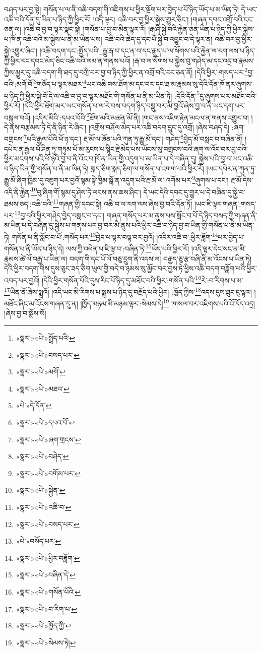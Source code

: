 བཤད་པར་བྱ་སྟེ། གསོན་པ་ལ་ནི་འཆི་བདག་གི་འཇིགས་པ་ཕྱིར་ལྡོག་པར་བྱེད་པ་པོ་ཉིད་ཡོད་པ་མ་ཡིན་ཏེ། དེ་ཡང་འཆི་བའི་དོན་དུ་ཡིན་པ་ཉིད་ཀྱི་ཕྱིར་རོ། །འདི་ལྟར། འཆི་བར་བྱ་ཕྱིར་སྐྱེས་གྱུར་ཅིང་། །གཞན་དབང་འགྲོ་བའི་ངང་ཅན་ལ། །འཆི་བ་བྱ་བ་ལྟར་སྣང་སྟེ། །གསོན་པ་བྱ་བ་མིན་ལྟར་རོ། །རྒ་ཤི་སྐྱེ་བའི་རྐྱེན་ཅན་ཡིན་པ་ཉིད་ཀྱི་ཕྱིར་སྐྱེས་པ་ཁོ་ན་འཆི་བའི་མ་སྐྱེས་པ་ནི་མ་ཡིན་པས། འཆི་བའི་ཆེད་དུ་དང་པོ་སྐྱེ་བ་འབྱུང་བ་དེ་ལྟར་ན། འཆི་བར་བྱ་ཕྱིར་སྐྱེ་འགྱུར་ཞིང་། །འཆི་བདག་དང་:སྤྱོད་པའི་\footnote{«སྣར་»«པེ་»སྤྲོད་པའི་}རྒྱུ་རྒ་བ་དང་ན་བ་དང་རྒུད་པ་ལ་སོགས་པའི་རྐྱེན་ལ་རག་ལས་པ་ཉིད་ཀྱི་ཕྱིར་རང་དབང་མེད་ཅིང་འཆི་བའི་ལམ་ན་གནས་པའོ། །རྒ་བ་ལ་སོགས་པ་སྐྱེས་བུ་གཤེད་མ་དང་འདྲ་བ་རྣམས་ཀྱིས་མྱུར་དུ་འཆི་བདག་གི་ཐད་དུ་བཀྲི་བར་བྱ་བ་ཉིད་ཀྱི་ཕྱིར་ན་འགྲོ་བའི་ངང་ཅན་ནོ། །དེའི་ཕྱིར་:གསད་པར་\footnote{«སྣར་»«པེ་»བསད་པར་}བྱ་བའི་:མགོ་བོ་\footnote{«སྣར་»«པེ་»མགོ་}གཅོད་པ་ལྟར་མཐར་\footnote{«སྣར་»«པེ་»མཐའ་}ཡང་འཆི་བས་ཐོག་མ་དང་བར་དང་ཐ་མ་རྣམས་སུ་དེའི་དོན་ཁོ་ནར་ཞུགས་པ་ཉིད་ཀྱི་ཕྱིར་སྐྱེ་བོ་དེ་ལ་འཆི་བ་བྱ་བ་ལྟར་མཐོང་གི་གསོན་པ་ནི་མ་ཡིན་ཏེ། :དེའི་དོན་\footnote{«པེ་»དེ་དོན་}དུ་ཞུགས་པར་མཐོང་བའི་ཕྱིར་རོ། །དེའི་ཕྱིར་ཐོག་མར་ཡང་གསོན་པ་ལ་རེ་བས་བདག་ཉིད་བསླུ་བར་མི་བྱའོ་ཞེས་བྱ་བ་ནི་ཡང་དག་པར་བསྐུལ་བའོ། །འདིར་མིའི་:དཔའ་བོའི་\footnote{«སྣར་»«པེ་»དཔའ་བོ་}ཐོག་མའི་མཚན་མོ་ནི། །གང་ནས་འཇིག་རྟེན་མངལ་ན་གནས་འགྱུར་བ། །དེ་ནས་བརྩམས་ཏེ་དེ་ནི་ཉིན་རེ་ཞིང་། །འགྲོས་བཤོལ་མེད་པར་འཆི་བདག་དྲུང་དུ་འགྲོ། །ཞེས་བཤད་དེ། :ཞག་བགྲངས་\footnote{«སྣར་»«པེ་»ཞག་གྲངས་}པའི་རྒྱལ་པོའི་ཕོ་ཉ་དང་། རྔ་མོ་ལ་ཞོན་པའི་ཀུན་ཏུ་རྒྱུ་མོ་དང་། གཤེད་\footnote{«སྣར་»«པེ་»བཤེད་}བྱེད་མོ་བསླང་བ་བཞིན་ནོ། །དཔེར་ན་རྒྱལ་པོ་ཤིན་ཏུ་གཏུམ་པོ་མ་རུངས་པ་སྙིང་རྗེ་མེད་པས་ཡོངས་སུ་བགྲངས་བའི་ཞག་ལ་འོང་བར་བྱ་བའི་ཕྱིར་མངགས་པའི་ཕོ་ཉའི་བྱ་བ་ནི་འོང་བ་ཁོ་ན་ཡིན་གྱི་འདུག་པ་མ་ཡིན་པ་དེ་བཞིན་དུ། སྐྱེས་པའི་བྱ་བ་ཡང་འཆི་བ་ཉིད་ཡིན་གྱི་གསོན་པ་ནི་མ་ཡིན་ཏེ། སྐད་ཅིག་སྐད་ཅིག་ལ་གསོན་པ་འགག་པའི་ཕྱིར་རོ། །ཡང་དཔེར་ན་ཀུན་ཏུ་རྒྱུ་མོ་ཞིག་ཁྱིམ་དུ་འཇུག་པར་བྱའོ་སྙམ་སྟེ་ཁྱིམ་སྒོ་ན་འདུག་པའི་རྔ་མོ་ལ་:འགོམ་པར་\footnote{«སྣར་»«པེ་»བགོམ་པར་}ཞུགས་པ་དང་། རྔ་མོ་དེས་འདི་ནི་རྐྱེན་\footnote{«སྣར་»«པེ་»སྐྱེན་}བུ་ཞིག་གོ་སྙམ་དུ་ཤེས་ཏེ་ལངས་ནས་ཆས་ཤིང་། དེ་ཡང་དེའི་དབང་དུ་གྱུར་པ་དེ་བཞིན་དུ་སྐྱེ་བ་ཐམས་ཅད་:འཆི་བའི་\footnote{«སྣར་»«པེ་»འཆི་བ་}གཞན་གྱི་དབང་སྟེ། འཆི་བ་ལ་རག་ལས་ཞེས་བྱ་བའི་དོན་ཏོ། །ཡང་ཇི་ལྟར་གཞན་:གསད་པར་\footnote{«སྣར་»«པེ་»བསད་པར་}བྱ་བའི་ཕྱིར་གཤེད་བྱེད་བསླང་བ་དང་། གཞན་གསོད་པར་མ་ནུས་པས་སློང་བ་པོ་དེ་ཉིད་བསད་ཀྱི་གཞན་ནི་མ་ཡིན་པ་དེ་བཞིན་དུ་སྐྱེས་པ་གནས་པར་བྱ་བར་མི་ནུས་པའི་ཕྱིར་འཆི་བ་ཉིད་བྱ་བ་ཡིན་གྱི་གསོན་པ་ནི་མ་ཡིན་ཏེ། གསོན་པ་ནི་སློང་བ་པོ་:གསོད་པར་\footnote{«པེ་»བསོད་པར་}བྱེད་པ་ལྟར་བལྟ་བར་བྱའོ། །འདིར་འཆི་བ་:ཕྱིར་ཟློག་\footnote{«སྣར་»«པེ་»ཕྱིར་བཟློག་}པར་བྱེད་པ་གསོན་པ་ནི་ཡོད་པ་ཉིད་དེ། ལས་ཀྱི་འཕེན་པ་ཇི་ལྟ་བ་:བཞིན་ཏེ་\footnote{«སྣར་»«པེ་»བཞིན་དེ་}ཡོད་པའི་ཕྱིར་རོ། །འདི་ལྟར་དེང་སང་ན་མི་རྣམས་ཚེ་ལོ་བརྒྱ་པ་ཡིན་ལ། བདག་གི་དང་པོ་ལོ་བཅུ་དྲུག་ནི་འདས་ལ། བརྒྱད་ཅུ་རྩ་བཞི་ནི་མ་འོངས་པ་ཡིན་ཏེ། དེའི་ཕྱིར་བདག་གིས་དུས་ཅུང་ཟད་ཅིག་ཡུལ་གྱི་བདེ་བ་ཉམས་སུ་མྱོང་བར་བྱས་ཏེ་ཕྱིས་འཆི་བདག་བཟློག་པའི་ཕྱིར་འབད་པར་བྱའོ། །དེའི་ཕྱིར་གསོན་པོའི་དུས་རིང་པོ་ཉིད་དུ་མཐོང་བའི་ཕྱིར་:གསོན་པའི་\footnote{«སྣར་»«པེ་»གསོན་པོའི་}རེ་:བ་རིགས་པ་མ་\footnote{«སྣར་»«པེ་»བ་རིག་པ་}ཡིན་ནོ་ཞེས་སྨྲའོ། །འདི་ཡང་མི་རིགས་པ་སྨྲས་པ་ཉིད་དུ་བརྗོད་པའི་ཕྱིར། :ཁྱོད་ཀྱིས་\footnote{«སྣར་»«པེ་»ཁྱོད་ཀྱི་}འདས་དུས་ཐུང་ངུ་ལྟར། །མཐོང་ཞིང་མ་འོངས་གཞན་དུ་ན། །ཁྱོད་མཉམ་མི་མཉམ་ལྟར་:སེམས་དེ།\footnote{«སྣར་»«པེ་»སེམས་ཏེ།} །གསལ་བར་འཇིགས་པའི་འོ་དོད་འདྲ། །ཞེས་བྱ་བ་སྨོས་སོ། 